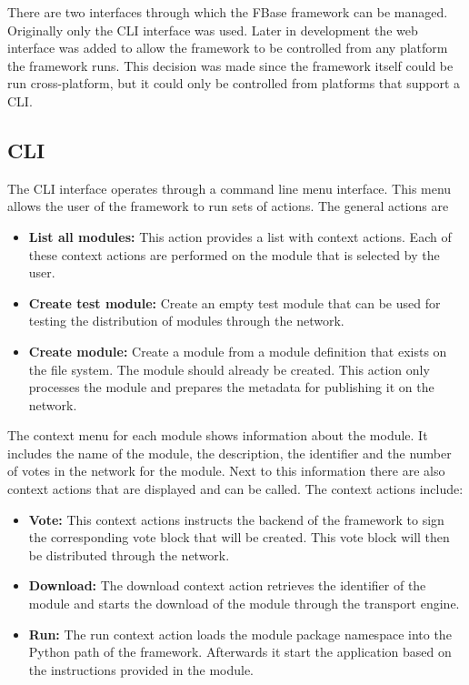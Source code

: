 There are two interfaces through which the FBase framework can be managed. Originally only the CLI interface was used. Later in development the web interface was added to allow the framework to be controlled from any platform the framework runs. This decision was made since the framework itself could be run cross-platform, but it could only be controlled from platforms that support a CLI.

\subsection{CLI}
The CLI interface operates through a command line menu interface. This menu allows the user of the framework to run sets of actions. The general actions are

\begin{itemize}
	\item \textbf{List all modules:} This action provides a list with context actions. Each of these context actions are performed on the module that is selected by the user.
	\item \textbf{Create test module:} Create an empty test module that can be used for testing the distribution of modules through the network.
	\item \textbf{Create module:} Create a module from a module definition that exists on the file system. The module should already be created. This action only processes the module and prepares the metadata for publishing it on the network.
\end{itemize}

The context menu for each module shows information about the module. It includes the name of the module, the description, the identifier and the number of votes in the network for the module. Next to this information there are also context actions that are displayed and can be called. The context actions include:

\begin{itemize}
	\item \textbf{Vote:} This context actions instructs the backend of the framework to sign the corresponding vote block that will be created. This vote block will then be distributed through the network.
	\item \textbf{Download:} The download context action retrieves the identifier of the module and starts the download of the module through the transport engine.
	\item \textbf{Run:} The run context action loads the module package namespace into the Python path of the framework. Afterwards it start the application based on the instructions provided in the module.
\end{itemize}

